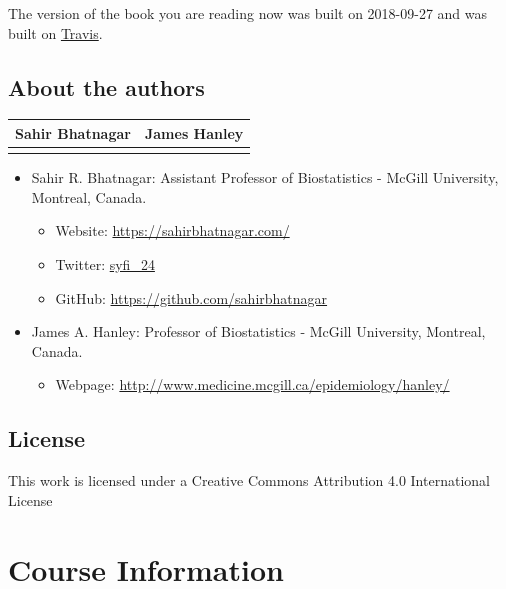 \documentclass[]{book}
\providecommand{\tightlist}{%
  \setlength{\itemsep}{0pt}\setlength{\parskip}{0pt}}
\providecommand{\tightlist}{%
  \setlength{\itemsep}{0pt}\setlength{\parskip}{0pt}}
\theoremstyle{definition}
\theoremstyle{definition}
\theoremstyle{definition}
\theoremstyle{remark}
\begin{document}
The version of the book you are reading now was built on 2018-09-27 and
was built on
\href{https://travis-ci.org/sahirbhatnagar/MATH697}{Travis}.

\section{About the authors}\label{about-the-authors}

\begin{longtable}[]{@{}cc@{}}
\toprule
Sahir Bhatnagar & James Hanley\tabularnewline
\midrule
\endhead
&\tabularnewline
\bottomrule
\end{longtable}

\begin{itemize}
\tightlist
\item
  Sahir R. Bhatnagar: Assistant Professor of Biostatistics - McGill
  University, Montreal, Canada.

  \begin{itemize}
  \tightlist
  \item
    Website: \url{https://sahirbhatnagar.com/}\\
  \item
    Twitter: \href{https://twitter.com/syfi_24}{syfi\_24}\\
  \item
    GitHub: \url{https://github.com/sahirbhatnagar}\\
  \end{itemize}
\item
  James A. Hanley: Professor of Biostatistics - McGill University,
  Montreal, Canada.

  \begin{itemize}
  \tightlist
  \item
    Webpage: \url{http://www.medicine.mcgill.ca/epidemiology/hanley/}
  \end{itemize}
\end{itemize}

\section{License}\label{license}

This work is licensed under a Creative Commons Attribution 4.0
International License

\chapter{Course Information}\label{course-information}
\end{document}
